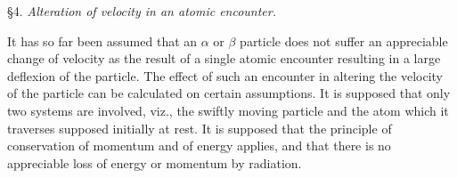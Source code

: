 \documentclass[12pt]{article}
\begin{document}
\bigskip
\S 4. {\it Alteration of velocity in an atomic encounter.}

\bigskip
It has so far been assumed that an $\alpha$ or $\beta$ particle does not suffer an appreciable change of velocity
as the result of a single atomic encounter resulting in a large deflexion of the particle.
The effect of such an encounter in altering the velocity of the particle can be calculated on certain assumptions.
It is supposed that only two systems are involved, viz., the swiftly moving particle and the atom which
it traverses supposed initially at rest.
It is supposed that the principle of conservation of momentum and of energy applies,
and that there is no appreciable loss of energy or momentum by radiation.
\end{document}
